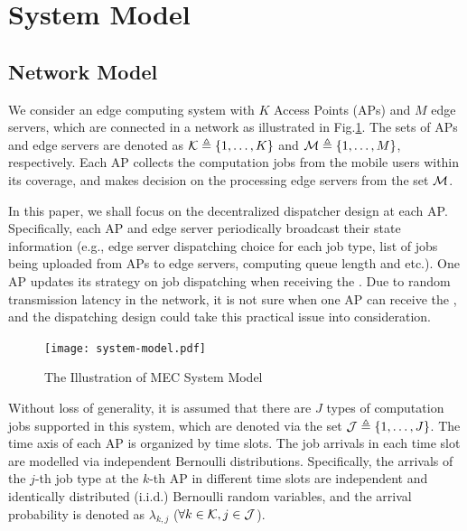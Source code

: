 \section{System Model}
\subsection{Network Model}
We consider an edge computing system with $K$ Access Points (APs) and $M$ edge servers, which are connected in a network as illustrated in Fig.\ref{fig:system}.
The sets of APs and edge servers are denoted as $\mathcal{K} \triangleq \{1,\dots,K\}$ and $\mathcal{M} \triangleq \{1,\dots,M\}$, respectively.
Each AP collects the computation jobs from the mobile users within its coverage, and makes decision on the processing edge servers from the set $\mathcal{M}$.

In this paper, we shall focus on the decentralized dispatcher design at each AP.
Specifically, each AP and edge server periodically broadcast their state information (e.g., edge server dispatching choice for each job type, list of jobs being uploaded from APs to edge servers, computing queue length and etc.).
One AP updates its strategy on job dispatching when receiving the .
Due to random transmission latency in the network, it is not sure when one AP can receive the , and the dispatching design could take this practical issue into consideration.

\begin{figure}[ht]
    \centering
    \texttt{[image: system-model.pdf]}
    \caption{The Illustration of MEC System Model}
    \label{fig:system}
\end{figure}

Without loss of generality, it is assumed that there are $J$ types of computation jobs supported in this system, which are denoted via the set $\mathcal{J} \triangleq \{1,\dots,J\}$.
The time axis of each AP is organized by time slots.
The job arrivals in each time slot are modelled via independent Bernoulli distributions.
Specifically, the arrivals of the $j$-th job type at the $k$-th AP in different time slots are independent and identically distributed (i.i.d.) Bernoulli random variables, and the arrival probability is denoted as $\lambda_{k,j}$ ($\forall k\in\mathcal{K}, j\in\mathcal{J}$).

